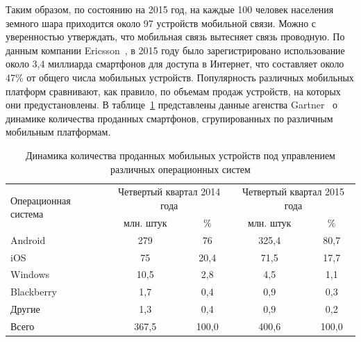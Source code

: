 Таким образом, по состоянию на 2015 год,
на каждые 100 человек населения земного шара приходится
около 97 устройств мобильной связи.
Можно с уверенностью утверждать, что мобильная связь
вытесняет связь проводную.
По данным компании Ericsson~\cite{ericsson_mobility_report},
в 2015 году было зарегистрировано использование около 3{,}4
миллиарда смартфонов для доступа в Интернет,
что составляет около 47\% от общего числа мобильных устройств.
Популярность различных мобильных платформ сравнивают, как правило,
по объемам продаж устройств, на которых они предустановлены.
В таблице~\ref{tbl:spec_stat_platforms} представлены данные
агенства Gartner~\cite{gartner_smartphone_stat} о динамике количества
проданных смартфонов, сгрупированных по различным мобильным платформам.

\begin{table}[h]
  \caption{
    Динамика количества проданных мобильных устройств
    под управлением различных операционных систем
  }\label{tbl:spec_stat_platforms}
    \begin{tabular}{| m{6cm} | c | c | c | c |}
      \hline
      \multirow{2}{*}{
      \parbox{6cm}{
      \smallskip
      \centering Операционная система
      \smallskip
      }
      }
      & \multicolumn{2}{c|}{
          \parbox{4.5cm}{
            \smallskip
            \centering Четвертый квартал 2014 года
            \smallskip
          }
        }
      & \multicolumn{2}{c|}{
          \parbox{4.5cm}{
            \smallskip
            \centering Четвертый квартал 2015 года
            \smallskip
          }
        } \\
      \cline{2-5}

      & млн. штук & \% & млн. штук & \% \\
      \hline

      Android &  279 & 76 & 325{,}4 & 80{,}7 \\
      \hline

      iOS &  75 & 20{,}4 & 71{,}5 & 17{,}7 \\
      \hline

      Windows & 10{,}5 & 2{,}8 & 4{,}5 & 1{,}1 \\
      \hline

      Blackberry & 1{,}7 & 0{,}4 & 0{,}9 & 0{,}3 \\
      \hline

      Другие & 1{,}3 & 0{,}4 & 0{,}9 & 0{,}2 \\
      \hline

      Всего & 367{,}5 & 100{,}0 & 400{,}6 & 100{,}0 \\
      \hline
    \end{tabular}
\end{table}
\vspace{-2.5mm}

